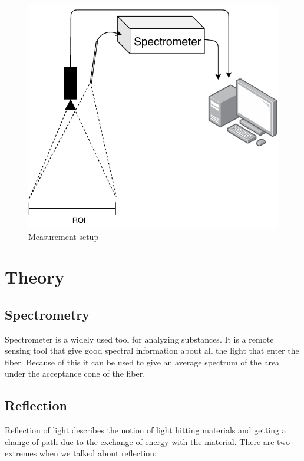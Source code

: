 \documentclass{article}
\begin{document}
\begin{figure}[hb]
    \centering
    \includegraphics[width=1\textwidth]{figures/pt_setup.pdf}
    \caption{Measurement setup}
    \label{fig:measurement_setup}
\end{figure}


\section{Theory}

\subsection{Spectrometry}
Spectrometer is a widely used tool for analyzing substances. It is a remote sensing tool that give good spectral information about all the light that enter the fiber. Because of this it can be used to give an average spectrum of the area under the acceptance cone of the fiber. 

\subsection{Reflection}
Reflection of light describes the notion of light hitting materials and getting a change of path due to the exchange of energy with the material. There are two extremes when we talked about reflection:
\end{document}

